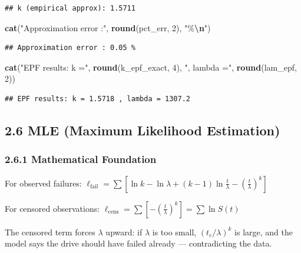 \documentclass[
]{article}
\newenvironment{Shaded}{\begin{snugshade}}{\end{snugshade}}
\newcommand{\DecValTok}[1]{\textcolor[rgb]{0.00,0.00,0.81}{#1}}
\newcommand{\FunctionTok}[1]{\textcolor[rgb]{0.13,0.29,0.53}{\textbf{#1}}}
\newcommand{\NormalTok}[1]{#1}
\newcommand{\SpecialCharTok}[1]{\textcolor[rgb]{0.81,0.36,0.00}{\textbf{#1}}}
\newcommand{\StringTok}[1]{\textcolor[rgb]{0.31,0.60,0.02}{#1}}
\begin{document}
\begin{verbatim}
## k (empirical approx): 1.5711
\end{verbatim}

\begin{Shaded}
\begin{Highlighting}[]
\FunctionTok{cat}\NormalTok{(}\StringTok{"Approximation error :"}\NormalTok{, }\FunctionTok{round}\NormalTok{(pct\_err, }\DecValTok{2}\NormalTok{), }\StringTok{"\%}\SpecialCharTok{\textbackslash{}n}\StringTok{"}\NormalTok{)}
\end{Highlighting}
\end{Shaded}

\begin{verbatim}
## Approximation error : 0.05 %
\end{verbatim}

\begin{Shaded}
\begin{Highlighting}[]
\FunctionTok{cat}\NormalTok{(}\StringTok{"EPF results: k ="}\NormalTok{, }\FunctionTok{round}\NormalTok{(k\_epf\_exact, }\DecValTok{4}\NormalTok{), }\StringTok{", lambda ="}\NormalTok{, }\FunctionTok{round}\NormalTok{(lam\_epf, }\DecValTok{2}\NormalTok{))}
\end{Highlighting}
\end{Shaded}

\begin{verbatim}
## EPF results: k = 1.5718 , lambda = 1307.2
\end{verbatim}

\subsection{2.6 MLE (Maximum Likelihood
Estimation)}\label{mle-maximum-likelihood-estimation}

\subsubsection{2.6.1 Mathematical
Foundation}\label{mathematical-foundation-5}

For observed failures:
\(\ell_{\text{fail}} = \sum \left[\ln k - \ln\lambda + (k-1)\ln\frac{t}{\lambda} - \left(\frac{t}{\lambda}\right)^k\right]\)

For censored observations:
\(\ell_{\text{cens}} = \sum \left[-\left(\frac{t}{\lambda}\right)^k\right] = \sum \ln S(t)\)

The censored term forces \(\lambda\) upward: if \(\lambda\) is too
small, \((t_c/\lambda)^k\) is large, and the model says the drive should
have failed already --- contradicting the data.
\end{document}
